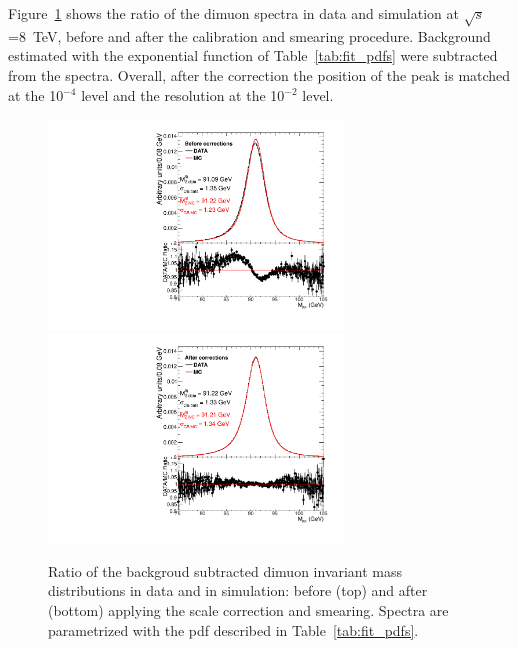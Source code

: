 Figure~\ref{fig:MassRatio_8TeV} shows the ratio of the dimuon spectra
in data and simulation at $\sqrt{s}$=8~TeV, before and after the calibration and smearing
procedure. Background estimated with the exponential function of
Table~\ref{tab:fit_pdfs} were subtracted from the spectra. Overall, after the
correction the position of the peak is matched at the 10$^{-4}$ level
and the resolution at the 10$^{-2}$ level.
\begin{figure}[hbtp]  
\begin{center}
\includegraphics[width=0.7\textwidth]{figures/MassRatio_Style/2012_22Jan2013ReReco/DimuonAfterBkgSub_beforeCorrections} 
\includegraphics[width=0.7\textwidth]{figures/MassRatio_Style/2012_22Jan2013ReReco/DimuonAfterBkgSub_afterCorrections}
 \hspace{1cm} 
   \caption{Ratio of the backgroud subtracted dimuon
     invariant mass distributions in data and in simulation: before (top) and after
     (bottom) applying the scale correction and smearing.
     Spectra are parametrized with the pdf described in Table~\ref{tab:fit_pdfs}.
   \label{fig:MassRatio_8TeV}}
 \end{center}
\end{figure} 


